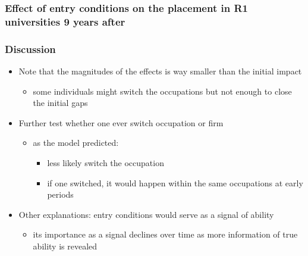 \documentclass[11pt]{beamer}
\begin{document}
{
	\begin{frame}
		\frametitle{Effect of entry conditions on the placement in R1 universities 9 years after}
		
	\end{frame}
}


\begin{frame}[label = discussion]
	\frametitle{Discussion}
	\begin{itemize}
		\item Note that the magnitudes of the effects is way smaller than the initial impact
		\begin{itemize}
			\item some individuals might switch the occupations but not enough to close the initial gaps
		\end{itemize}
		\item Further test whether one ever switch occupation or firm   \hyperlink{mobility}{}
		\begin{itemize}
			\item as the model predicted:
			\begin{itemize}
				\item less likely switch the occupation
				\item if one switched, it would happen within the same occupations at early periods
			\end{itemize}
		\end{itemize} 
			\item Other explanations: entry conditions would serve as a signal of ability
			\begin{itemize}
				\item its importance as a signal declines over time as more information of true ability is revealed \hyperlink{signal}{}
			\end{itemize} 
	\end{itemize}
\end{frame}
\end{document}
